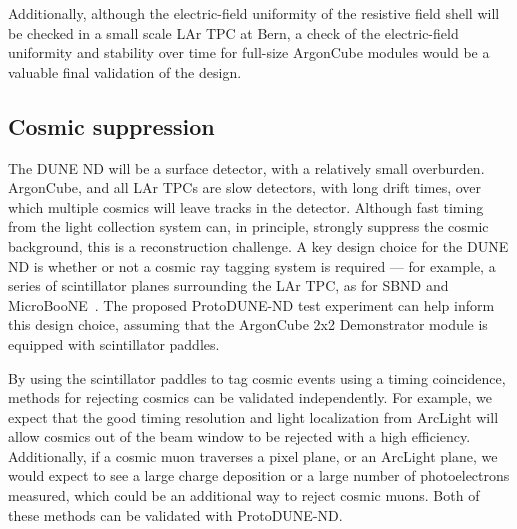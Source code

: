 Additionally, although the electric-field uniformity of the resistive field shell will be checked in a small scale LAr TPC at Bern, a check of the electric-field uniformity and stability over time for full-size ArgonCube modules would be a valuable final validation of the design.

\subsection{Cosmic suppression}

The DUNE ND will be a surface detector, with a relatively small overburden. ArgonCube, and all LAr TPCs are slow detectors, with long drift times, over which multiple cosmics will leave tracks in the detector. Although fast timing from the light collection system can, in principle, strongly suppress the cosmic background, this is a reconstruction challenge. A key design choice for the DUNE ND is whether or not a cosmic ray tagging system is required --- for example, a series of scintillator planes surrounding the LAr TPC, as for SBND and MicroBooNE~\cite{CRT}. The proposed ProtoDUNE-ND test experiment can help inform this design choice, assuming that the ArgonCube 2x2 Demonstrator module is equipped with scintillator paddles.

By using the scintillator paddles to tag cosmic events using a timing coincidence, methods for rejecting cosmics can be validated independently. For example, we expect that the good timing resolution and light localization from ArcLight will allow cosmics out of the beam window to be rejected with a high efficiency. Additionally, if a cosmic muon traverses a pixel plane, or an ArcLight plane, we would expect to see a large charge deposition or a large number of photoelectrons measured, which could be an additional way to reject cosmic muons. Both of these methods can be validated with ProtoDUNE-ND.

